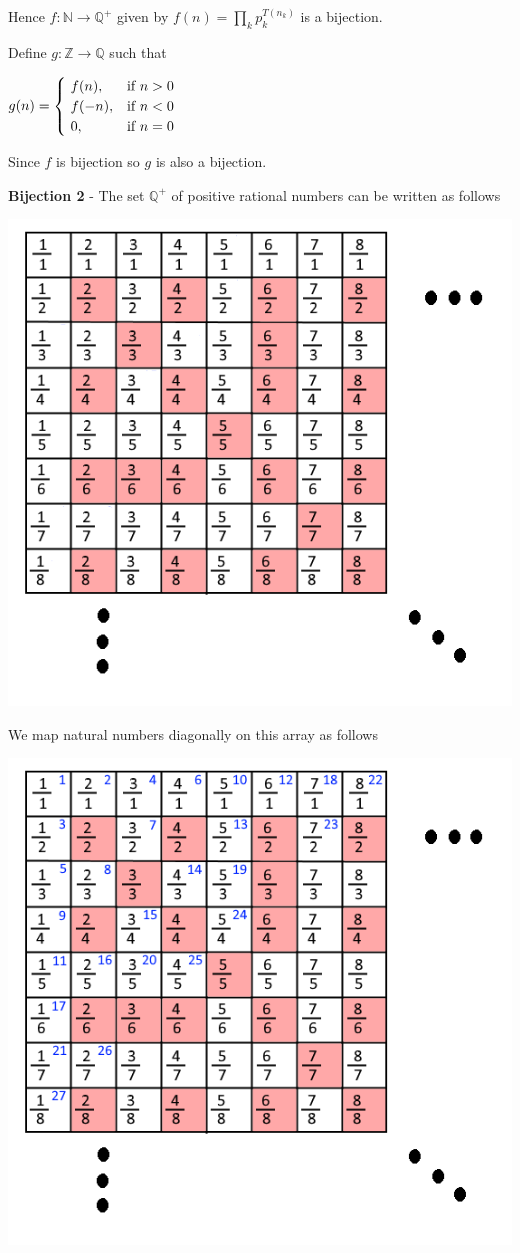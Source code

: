 \documentclass{article}
\begin{document}
    \qquad Hence $f: \mathbb{N}\rightarrow \mathbb{Q^+}$ given by $f(n)=\prod_{k}p_k^{T(n_k)}$ is a bijection.
    
    
    \qquad Define $g: \mathbb{Z} \rightarrow \mathbb{Q}$ such that
    
    \qquad $g(n)=
    \begin{cases}
        ~f(n), & \hbox{if $n>0$} \\
        ~f(-n), & \hbox{if $n<0$} \\
        ~0, & \hbox{if $n=0$}
    \end{cases}$
    
    \qquad Since $f$ is bijection so $g$ is also a bijection. 
                
    \quad \textbf{Bijection 2} - The set $\mathbb{Q^+}$ of positive rational numbers can be written as follows

    \begin{center}
    \includegraphics[width=3.5 in]{Images/a1-q4-1.png}
    \end{center}
    
    \quad We map natural numbers diagonally on this array as follows
    
    \begin{center}
    \includegraphics[width=3.5 in]{Images/a1-q4-2.png}
    \end{center}
    
\end{document}

